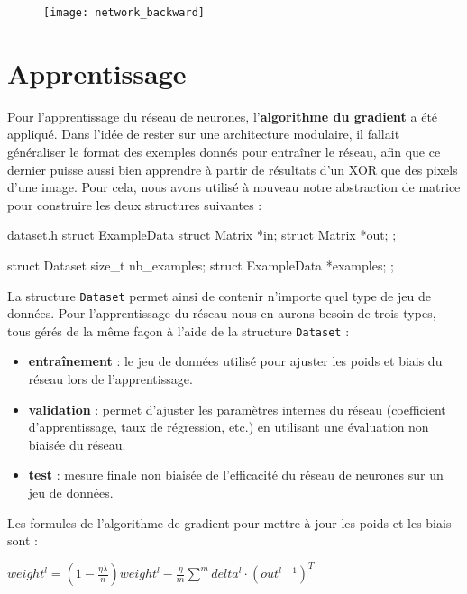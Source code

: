 \begin{figure}[H]
    \centering
    \texttt{[image: network\_backward]}
\end{figure}

\newpage

\section{Apprentissage}

Pour l'apprentissage du réseau de neurones, l'\textbf{algorithme du gradient} a
été appliqué. Dans l'idée de rester sur une architecture modulaire, il fallait
généraliser le format des exemples donnés pour entraîner le réseau, afin que ce
dernier puisse aussi bien apprendre à partir de résultats d'un XOR que des
pixels d'une image. Pour cela, nous avons utilisé à nouveau notre abstraction de
matrice pour construire les deux structures suivantes :

\begin{myminted}{dataset.h}
struct ExampleData
{
    struct Matrix *in;
    struct Matrix *out;
};

struct Dataset
{
    size_t nb_examples;
    struct ExampleData *examples;
};
\end{myminted}

La structure \texttt{Dataset} permet ainsi de contenir n'importe quel
type de jeu de données. Pour l'apprentissage du réseau nous en aurons besoin de
trois types, tous gérés de la même façon à l'aide de la structure
\texttt{Dataset} :

\begin{itemize}
    \item \textbf{entraînement} : le jeu de données utilisé pour ajuster les
        poids et biais du réseau lors de l'apprentissage.
    \item \textbf{validation} : permet d'ajuster les paramètres internes du
        réseau (coefficient d'apprentissage, taux de régression, etc.) en
        utilisant une évaluation non biaisée du réseau.
    \item \textbf{test} : mesure finale non biaisée de l'efficacité du réseau de
        neurones sur un jeu de données.
\end{itemize}

Les formules de l'algorithme de gradient pour mettre à jour les poids et les
biais sont :

$weight^l = (1 - \frac{\eta\lambda}{n}) weight^l - \frac{\eta}{m} \displaystyle\sum^m{delta^l \cdot (out^{l-1})^T}$

